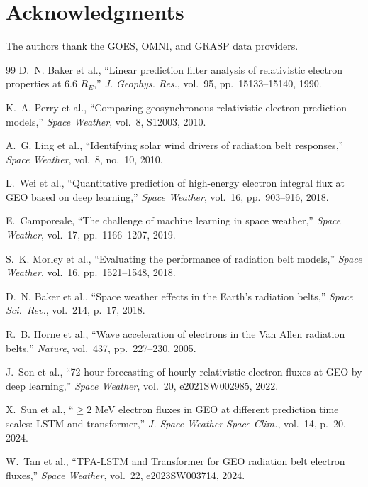 \documentclass[conference]{IEEEtran}
\begin{document}
\section*{Acknowledgments}
The authors thank the GOES, OMNI, and GRASP data providers.

\begin{thebibliography}{99}
D.~N. Baker et al., ``Linear prediction filter analysis of relativistic
electron properties at 6.6 \(R_E\),'' \emph{J. Geophys. Res.}, vol.~95,
pp.~15133--15140, 1990.

K.~A. Perry et al., ``Comparing geosynchronous relativistic electron
prediction models,'' \emph{Space Weather}, vol.~8, S12003, 2010.

A.~G. Ling et al., ``Identifying solar wind drivers of radiation belt
responses,'' \emph{Space Weather}, vol.~8, no.~10, 2010.

L.~Wei et al., ``Quantitative prediction of high-energy electron integral flux
at GEO based on deep learning,'' \emph{Space Weather}, vol.~16,
pp.~903--916, 2018.

E.~Camporeale, ``The challenge of machine learning in space weather,''
\emph{Space Weather}, vol.~17, pp.~1166--1207, 2019.

S.~K. Morley et al., ``Evaluating the performance of radiation belt models,''
\emph{Space Weather}, vol.~16, pp.~1521--1548, 2018.

D.~N. Baker et al., ``Space weather effects in the Earth's radiation belts,''
\emph{Space Sci.\ Rev.}, vol.~214, p.~17, 2018.

R.~B. Horne et al., ``Wave acceleration of electrons in the Van Allen
radiation belts,'' \emph{Nature}, vol.~437, pp.~227--230, 2005.

J.~Son et al., ``72-hour forecasting of hourly relativistic electron fluxes at
GEO by deep learning,'' \emph{Space Weather}, vol.~20, e2021SW002985, 2022.

X.~Sun et al., ``\(\ge2\) MeV electron fluxes in GEO at different prediction
time scales: LSTM and transformer,'' \emph{J. Space Weather Space Clim.},
vol.~14, p.~20, 2024.

W.~Tan et al., ``TPA-LSTM and Transformer for GEO radiation belt electron
fluxes,'' \emph{Space Weather}, vol.~22, e2023SW003714, 2024.


\end{thebibliography}
\end{document}

